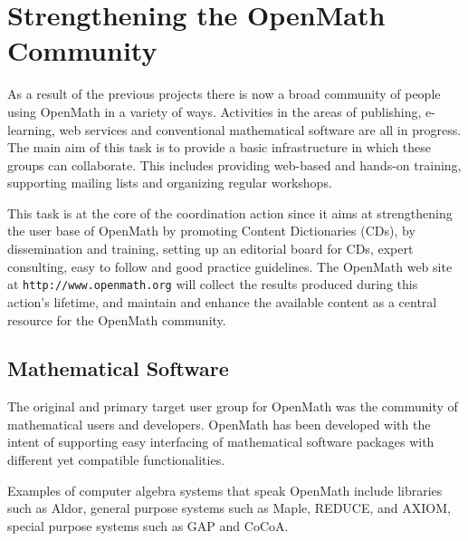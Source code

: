 \documentclass{euproposal}
\begin{document}
\section{Strengthening the OpenMath Community} 
\label{community}


As a result of the previous projects there is now a broad community of
people using OpenMath in a variety of ways.  Activities in the areas
of publishing, e-learning, web services and conventional mathematical
software are all in progress.  The main aim of this task is to provide
a basic infrastructure in which these groups can collaborate. This
includes providing web-based and hands-on training, supporting mailing
lists and organizing regular workshops.

This task is at the core of the coordination action since it aims at
strengthening the user base of OpenMath by promoting Content
Dictionaries (CDs), by dissemination and training, setting up an editorial
board for CDs, expert consulting, easy to follow and good practice
guidelines. The OpenMath web site at \texttt{http://www.openmath.org}
will collect the results produced during this action's lifetime, and
maintain and enhance the available content as a central resource for
the OpenMath community. 





\subsection{Mathematical Software}
\label{sec:msw}

The original and primary target user group for OpenMath was the
community of mathematical users and developers. OpenMath has been
developed with the intent of supporting easy interfacing of
mathematical software packages with different yet compatible
functionalities.

Examples of computer algebra systems that speak OpenMath include
libraries such as Aldor, general purpose systems such as Maple,
REDUCE, and AXIOM, special purpose systems such as GAP and CoCoA.
\end{document}
